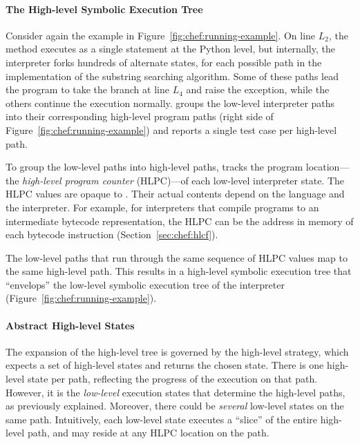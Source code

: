 \paragraph{The High-level Symbolic Execution Tree}

Consider again the example in Figure~\ref{fig:chef:running-example}.
%
On line $L_2$, the  method executes as a single statement at the Python level, but internally, the interpreter forks hundreds of alternate states, for each possible path in the implementation of the substring searching algorithm.
%
Some of these paths lead the program to take the branch at line $L_4$ and raise the exception, while the others continue the execution normally.
%
\chef groups the low-level interpreter paths into their corresponding high-level program paths (right side of Figure~\ref{fig:chef:running-example}) and reports a single test case per high-level path.


To group the low-level paths into high-level paths, \chef tracks the program location---the \emph{high-level program counter} (HLPC)---of each low-level interpreter state.
%
The HLPC values are opaque to \chef.  Their actual contents depend on the language and the interpreter.  For example, for interpreters that compile programs to an intermediate bytecode representation, the HLPC can be the address in memory of each bytecode instruction (Section~\ref{sec:chef:hlcf}).

The low-level paths that run through the same sequence of HLPC values map to the same high-level path.
%
This results in a high-level symbolic execution tree that ``envelops'' the low-level symbolic execution tree of the interpreter (Figure~\ref{fig:chef:running-example}).

\paragraph{Abstract High-level States}

The expansion of the high-level tree is governed by the high-level strategy, which expects a set of high-level states and returns the chosen state.
%
There is one high-level state per path, reflecting the progress of the execution on that path.
%
However, it is the \emph{low-level} execution states that determine the high-level paths, as previously explained.
%
Moreover, there could be \emph{several} low-level states on the same path.
Intuitively, each low-level state executes a ``slice'' of the entire high-level path, and may reside at any HLPC location on the path.


